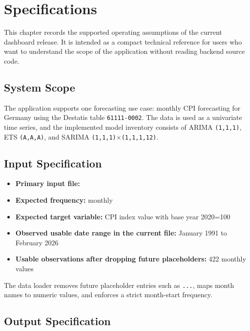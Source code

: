 %
%

\chapter{Specifications}

This chapter records the supported operating assumptions of the current dashboard release. It is intended as a compact technical reference for users who want to understand the scope of the application without reading backend source code.

\section{System Scope}

The application supports one forecasting use case: monthly CPI forecasting for Germany using the Destatis table \texttt{61111-0002}. The data is used as a univariate time series, and the implemented model inventory consists of ARIMA \texttt{(1,1,1)}, ETS \texttt{(A,A,A)}, and SARIMA \texttt{(1,1,1)$\times$(1,1,1,12)}.

\section{Input Specification}

\begin{itemize}
    \item \textbf{Primary input file:} 
    \item \textbf{Expected frequency:} monthly
    \item \textbf{Expected target variable:} CPI index value with base year 2020=100
    \item \textbf{Observed usable date range in the current file:} January 1991 to February 2026
    \item \textbf{Usable observations after dropping future placeholders:} 422 monthly values
\end{itemize}

The data loader removes future placeholder entries such as \texttt{...}, maps month names to numeric values, and enforces a strict month-start frequency.

\section{Output Specification}

